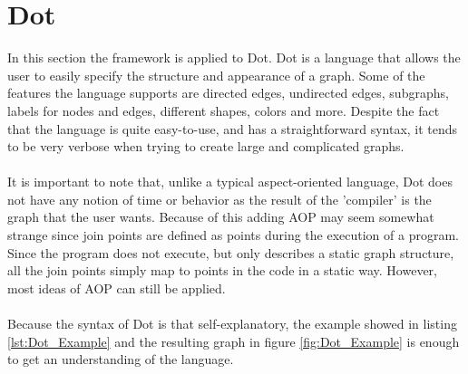 \documentclass[a4paper]{report}
\begin{document}
\chapter{Dot}
\label{chap:Dot}
In this section the framework is applied to Dot. Dot is a language that allows the user to easily specify the structure and appearance of a graph. Some of the features the language supports  are directed edges, undirected edges, subgraphs, labels for nodes and edges, different shapes, colors and more. Despite the fact that the language is quite easy-to-use, and has a straightforward syntax, it tends to be very verbose when trying to create large and complicated graphs.\\
\\
It is important to note that, unlike a typical aspect-oriented language, Dot does not have any notion of time or behavior as the result of the 'compiler' is the graph that the user wants. Because of this adding AOP may seem somewhat strange since join points are defined as points during the execution of a program. Since the program does not execute, but only describes a static graph structure, all the join points simply map to points in the code in a static way. However, most ideas of AOP can still be applied.\\
\\
Because the syntax of Dot is that self-explanatory, the example showed in listing \ref{lst:Dot_Example} and the resulting graph in figure \ref{fig:Dot_Example} is enough to get an understanding of the language.\\
\end{document}
